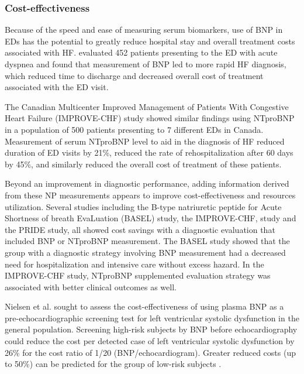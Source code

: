 \documentclass[14pt,a4paper,onecolumn]{extarticle}
\begin{document}
\subsubsection{Cost-effectiveness}

Because of the speed and ease of measuring serum biomarkers, use of BNP in EDs has the potential to greatly reduce hospital stay and overall treatment costs associated with HF. \citep{Mueller2004} evaluated 452 patients presenting to the ED with acute dyspnea and found that measurement of BNP led to more rapid HF diagnosis, which reduced time to discharge and decreased overall cost of treatment associated with the ED visit.  %

The Canadian Multicenter Improved Management of Patients With Congestive Heart Failure (IMPROVE-CHF) study showed similar findings using NTproBNP in a population of 500 patients presenting to 7 different EDs in Canada. Measurement of serum NTproBNP level to aid in the diagnosis of HF reduced duration of ED visits by 21\%, reduced the rate of rehospitalization after 60 days by 45\%, and similarly reduced the overall cost of treatment of these patients. \citep{Moe2007} %

Beyond an improvement in diagnostic performance, adding information derived from these NP measurements appears to improve cost-effectiveness and resources utilization. Several studies including the B-type natriuretic peptide for Acute Shortness of breath EvaLuation (BASEL) study, the IMPROVE-CHF, study and the PRIDE study, all showed cost savings with a diagnostic evaluation that included BNP or NTproBNP measurement. The BASEL study showed that the group with a diagnostic strategy involving BNP measurement had a decreased need for hospitalization and intensive care without excess hazard. In the IMPROVE-CHF study, NTproBNP supplemented evaluation strategy was associated with better clinical outcomes as well. \citep{Gaggin2014}

Nielsen et al. \citep{bib392} sought to assess the cost-effectiveness of using plasma BNP as a pre-echocardiographic screening test for left ventricular systolic dysfunction in the general population. Screening high-risk subjects by BNP before echocardiography could reduce the cost per detected case of left ventricular systolic dysfunction by 26\% for the cost ratio of 1/20 (BNP/echocardiogram). Greater reduced costs (up to 50\%) can be predicted for the group of low-risk subjects \citep{bib392}. %
\end{document}
